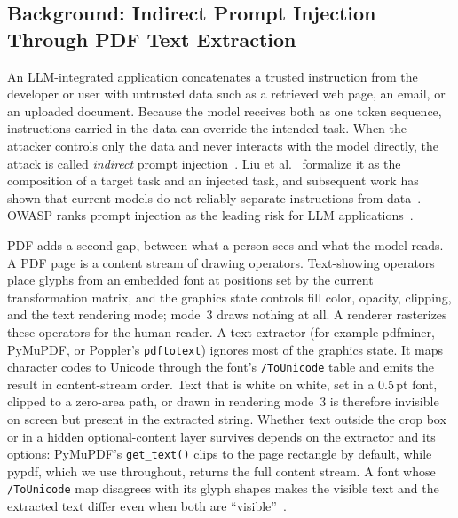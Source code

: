 
\subsection{Background: Indirect Prompt Injection Through PDF Text Extraction}
\label{sec:background}

An LLM-integrated application concatenates a trusted instruction from the
developer or user with untrusted data such as a retrieved web page, an email,
or an uploaded document. Because the model receives both as one token
sequence, instructions carried in the data can override the intended task.
When the attacker controls only the data and never interacts with the model
directly, the attack is called \emph{indirect} prompt
injection~\cite{greshake2023not}. Liu et al.~\cite{liu2024formalizing}
formalize it as the composition of a target task and an injected task, and
subsequent work has shown that current models do not reliably separate
instructions from data~\cite{zverev2025can}. OWASP ranks prompt injection as
the leading risk for LLM applications~\cite{owasp2025llm01}.

PDF adds a second gap, between what a person sees and what the model reads.
A PDF page is a content stream of drawing operators. Text-showing operators
place glyphs from an embedded font at positions set by the current
transformation matrix, and the graphics state controls fill color, opacity,
clipping, and the text rendering mode; mode~3 draws nothing at all. A
renderer rasterizes these operators for the human reader. A text extractor
(for example pdfminer, PyMuPDF, or Poppler's \texttt{pdftotext}) ignores most
of the graphics state. It maps character codes to Unicode through the font's
\texttt{/ToUnicode} table and emits the result in content-stream order.
Text that is white on white, set in a 0.5\,pt font, clipped to a zero-area
path, or drawn in rendering mode~3 is therefore invisible on screen but
present in the extracted string. Whether text outside the crop box or in a
hidden optional-content layer survives depends on the extractor and its
options: PyMuPDF's \texttt{get\_text()} clips to the page rectangle by
default, while pypdf, which we use throughout, returns the full content
stream. A font whose \texttt{/ToUnicode} map
disagrees with its glyph shapes makes the visible text and the extracted
text differ even when both are
``visible''~\cite{markwood2017pdf,xiong2025invisible,luo2026exploiting}.

